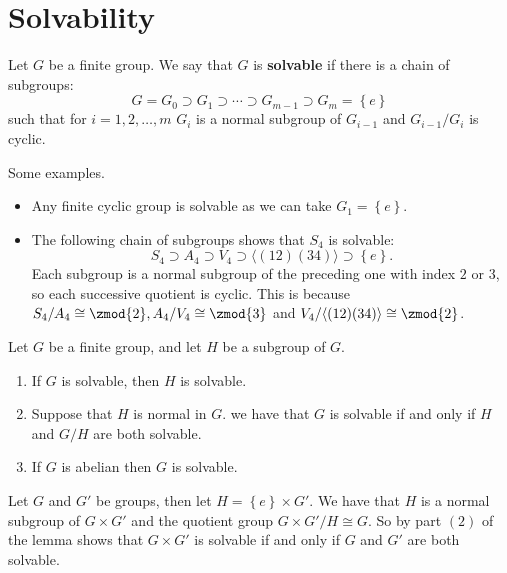 \documentclass[12pt, a4paper]{article}
\begin{document}
\section{Solvability}

\begin{definition}
    Let \(G\) be a finite group. We say that \(G\) is \textbf{solvable} if there is a chain of subgroups:
    \[G =G_0 \supset G_1 \supset \cdots \supset G_{m-1}\supset G_m = \left\{ e \right\}\]
    such that for \(i=1,2,\ldots,m\) \(G_i\) is a normal subgroup of \(G_{i-1}\) and \(G_{i-1}/G_i\) is cyclic.
\end{definition}

\begin{example}
    Some examples.
    \begin{itemize}
        \item Any finite cyclic group is solvable as we can take \(G_1=\left\{ e \right\}\).
        \item The following chain of subgroups shows that \(S_4\) is solvable:
        \[S_4 \supset A_4 \supset V_4 \supset \langle (12)(34)\rangle \supset \left\{ e \right\}.\]
        Each subgroup is a normal subgroup of the preceding one with index \(2\) or \(3\), so each successive quotient is cyclic. This is because \(S_4/A_4 \cong \zmod{2} , A_4/V_4 \cong \zmod{3}\) and \(V_4/\langle (12)(34)\rangle \cong \zmod{2}\).
    \end{itemize}
\end{example}

\begin{mdlemma}
    Let \(G\) be a finite group, and let \(H\) be a subgroup of \(G\). 
    \begin{enumerate}
        \item If \(G\) is solvable, then \(H\) is solvable.
        \item Suppose that \(H\) is normal in \(G\). we have that \(G\) is solvable if and only if \(H\) and \(G/H\) are both solvable.
        \item If \(G\) is abelian then \(G\) is solvable.
    \end{enumerate}
\end{mdlemma}

\begin{mdexample}
    Let \(G\) and \(G'\) be groups, then let \(H = \left\{ e\right\}\times G'\). We have that \(H\) is a normal subgroup of \(G \times G'\) and the quotient group \(G \times G'/H \cong G\). So by part \((2)\) of the lemma shows that \(G \times G'\) is solvable if and only if \(G\) and \(G'\) are both solvable.
\end{mdexample}
\end{document}
